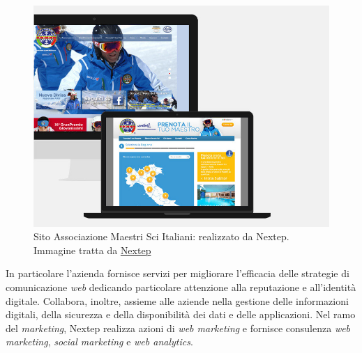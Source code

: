 \begin{figure}[h]
\centering
\includegraphics[scale=0.35]{immagini/amsi.jpg}
\caption{Sito Associazione Maestri Sci Italiani: realizzato da Nextep. Immagine tratta da \href{http://www.nextep.it/}{Nextep}}
\label{fig:amsi}
\end{figure}
In particolare l'azienda fornisce servizi per migliorare l'efficacia delle strategie di comunicazione \emph{web} dedicando particolare attenzione alla reputazione e all'identità digitale. Collabora, inoltre, assieme alle aziende nella gestione delle informazioni digitali, della sicurezza e della disponibilità dei dati e delle applicazioni. Nel ramo del \emph{marketing}, Nextep realizza azioni di \emph{web marketing} e fornisce consulenza \emph{web marketing}, \emph{social marketing} e \emph{web analytics}.

